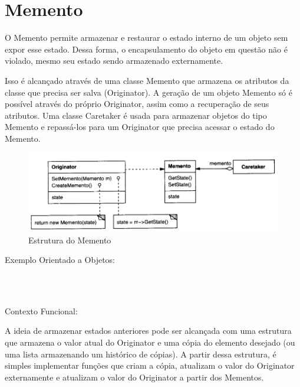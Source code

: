 \section{Memento}

O Memento permite armazenar e restaurar o estado interno de um 
objeto sem expor esse estado. Dessa forma, o encapsulamento do 
objeto em questão não é violado, mesmo seu estado sendo armazenado 
externamente.

Isso é alcançado através de uma classe Memento que armazena os 
atributos da classe que precisa ser salva (Originator). A geração 
de um objeto Memento só é possível através do próprio Originator, 
assim como a recuperação de seus atributos. Uma classe Caretaker 
é usada para armazenar objetos do tipo Memento e repassá-los para 
um Originator que precisa acessar o estado do Memento.

\begin{figure}[htb]
	\caption{\label{fig_grafico}Estrutura do Memento}
	\begin{center}
	    \includegraphics[scale=0.5]{5_padroes-contexto-funcional/5.3_comportamentais/5.3.06_memento/diagram.png}
	\end{center}
\end{figure}

Exemplo Orientado a Objetos:

\begin{lstlisting}[caption={Memento Orientação a Objetos},label=oomemento]



\end{lstlisting}

Contexto Funcional:

A ideia de armazenar estados anteriores pode ser alcançada com uma 
estrutura que armazena o valor atual do Originator e uma cópia do 
elemento desejado (ou uma lista armazenando um histórico de cópias). 
A partir dessa estrutura, é simples implementar funções que criam 
a cópia, atualizam o valor do Originator externamente e atualizam 
o valor do Originator a partir dos Mementos.

\begin{lstlisting}[caption={Memento Funcional},label=fpmemento]



\end{lstlisting}